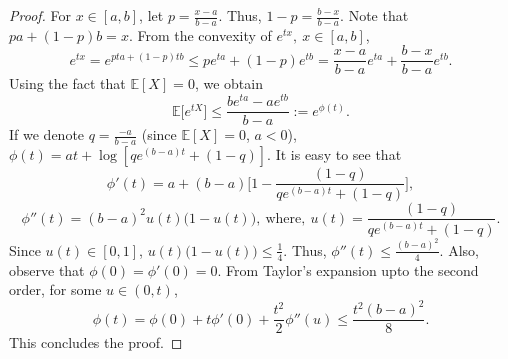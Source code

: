 \documentclass[a4paper,english,12pt]{article}
\begin{document}
\begin{proof}
For $x\in[a,b]$, let $p=\frac{x-a}{b-a}$. Thus, $1-p=\frac{b-x}{b-a}$. Note that $pa+(1-p)b=x$. From the convexity of $e^{tx},~x\in[a,b]$, $$e^{tx}=e^{pta+(1-p)tb}\leq pe^{ta}+(1-p)e^{tb}=\frac{x-a}{b-a}e^{ta}+\frac{b-x}{b-a}e^{tb}.$$ Using the fact that $\mathbb{E}[X]=0$, we obtain $$\mathbb{E}\big[e^{tX}\big]\leq \frac{be^{ta}-ae^{tb}}{b-a}:=e^{\phi(t)}.$$
If we denote $q=\frac{-a}{b-a}$ (since $\mathbb{E}[X]=0$, $a<0$), $\phi(t)=at+\log [q e^{(b-a)t}+(1-q)]$. It is easy to see that $$\phi'(t)=a+(b-a)\Big[1-\frac{(1-q)}{qe^{(b-a)t}+(1-q)}\Big],$$ $$\phi''(t)=(b-a)^2u(t)\big(1-u(t)\big),~\text{where},~ u(t)=\frac{(1-q)}{qe^{(b-a)t}+(1-q)}.$$ Since $u(t)\in[0,1]$, $u(t)\big(1-u(t)\big)\leq \frac{1}{4}$. Thus, $\phi''(t)\leq \frac{(b-a)^2}{4}$. Also, observe that $\phi(0)=\phi'(0)=0$. From Taylor's expansion upto the second order, for some $u\in(0,t)$, $$\phi(t)=\phi(0)+t\phi'(0)+\frac{t^2}{2}\phi''(u)\leq \frac{t^2(b-a)^2}{8}.$$ This concludes the proof. 
\end{proof}
\end{document}
